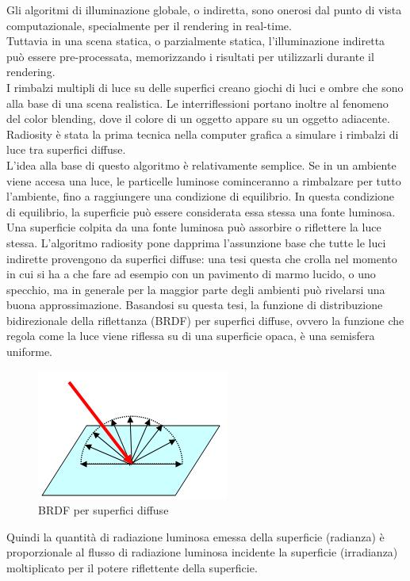 Gli algoritmi di illuminazione globale, o indiretta, sono onerosi dal punto di vista computazionale, specialmente per il rendering in real-time.
\\
Tuttavia in una scena statica, o parzialmente statica, l’illuminazione indiretta può essere pre-processata, memorizzando i risultati per utilizzarli durante il rendering.
\\
I rimbalzi multipli di luce su delle superfici creano giochi di luci e ombre che sono alla base di una scena realistica. Le interriflessioni portano inoltre al fenomeno del color blending, dove il colore di un oggetto appare su un oggetto adiacente. 
Radiosity è stata la prima tecnica nella computer grafica a simulare i rimbalzi di luce tra superfici diffuse.
\\
L’idea alla base di questo algoritmo è relativamente semplice. Se in un ambiente viene accesa una luce, le particelle luminose cominceranno a rimbalzare per tutto l’ambiente, fino a raggiungere una condizione di equilibrio. In questa condizione di equilibrio, la superficie può essere considerata essa stessa una fonte luminosa.
\\
Una superficie colpita da una fonte luminosa può assorbire o riflettere la luce stessa. L’algoritmo radiosity pone dapprima l’assunzione base che tutte le luci indirette provengono da superfici diffuse: una tesi questa che crolla nel momento in cui si ha a che fare ad esempio con un pavimento di marmo lucido, o uno specchio, ma in generale per la maggior parte degli ambienti può rivelarsi una buona approssimazione. Basandosi su questa tesi, la funzione di distribuzione bidirezionale della riflettanza (BRDF) per superfici diffuse, ovvero la funzione che regola come la luce viene riflessa su di una superficie opaca, è una semisfera uniforme.
\begin{figure}[htb]
 \centering
 \includegraphics[width=0.4\linewidth]{images/chapter_stato_arte/stato_attuale_brdf_semistefa.png}\hfill
 \caption[BRDF superfici diffuse]{BRDF per superfici diffuse}
 \label{fig:stato_attuale_brdf_semistefa}
\end{figure}
Quindi la quantità di radiazione luminosa emessa della superficie (radianza) è proporzionale al flusso di radiazione luminosa incidente la superficie (irradianza) moltiplicato per il potere riflettente della superficie. 
